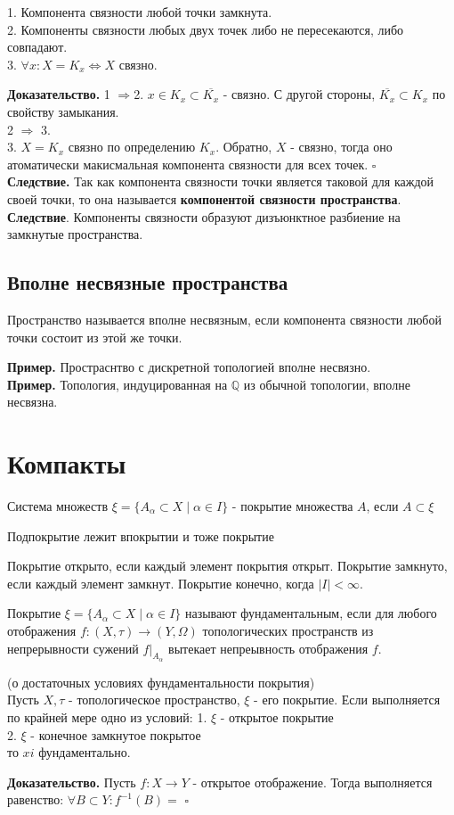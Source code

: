 \begin{theor}
1. Компонента связности любой точки замкнута.\\
2. Компоненты связности любых двух точек либо не пересекаются, либо 
совпадают.\\
3. $\forall x: X=K_x\iff X$ связно.
\end{theor}
\textbf{Доказательство.} 1 $\Rightarrow$2.
$x\in K_x\subset \overline{K_x}$ - связно.
С другой стороны, $\overline{K_x}\subset K_x$ по свойству замыкания.\\
2 $\Rightarrow$ 3. \\
3. $X=K_x$  связно по определению  $K_x$. Обратно,  $X$ - связно, тогда оно
атоматически макисмальная компонента связности для всех точек.
$\square$\\
\textbf{Следствие.} Так как компонента связности точки является таковой для
каждой своей точки, то она называется \textbf{компонентой связности 
пространства}.\\
\textbf{Следствие}. Компоненты связности образуют дизъюнктное разбиение
на замкнутые пространства. 
\subsection{Вполне несвязные пространства}
\begin{defin}
Пространство называется вполне несвязным, если компонента связности любой
точки состоит из этой же точки. 
\end{defin}
\textbf{Пример.} Простраснтво с дискретной топологией вполне несвязно.\\
\textbf{Пример.} Топология, индуцированная на $\mathbb{Q}$ из обычной 
топологии, вполне несвязна. 
\section{Компакты}
\begin{defin}
Система множеств $\xi=\{A_\alpha \subset X \mid \alpha\in I\}$ - покрытие
множества $A$, если  $A\subset \xi$
\end{defin}

Подпокрытие лежит впокрытии и тоже покрытие

Покрытие открыто, если каждый элемент покрытия открыт.
Покрытие замкнуто, если каждый элемент замкнут. 
Покрытие конечно, когда $|I|<\infty$. 
\begin{defin}
Покрытие $\xi=\{A_\alpha \subset X \mid \alpha\in I\}$ 
называют фундаментальным, если для любого отображения 
$f\colon  (X,\tau)\to (Y,\Omega)$
топологических пространств из непрерывности сужений $f|_{A_\alpha}$ 
вытекает непреывность отображения $f$.
\end{defin}
\begin{theor} (о достаточных условиях фундаментальности покрытия)\\
Пусть $X,\tau$ - топологическое пространство,  $\xi$ - его покрытие. 
Если выполняется по крайней мере одно из условий:
1. $\xi$ - открытое покрытие\\
2. $\xi$ - конечное замкнутое покрытое\\
то  $xi$ фундаментально.
\end{theor}
\textbf{Доказательство.} Пусть $f\colon X\to Y$ - открытое отображение. 
Тогда выполняется равенство: 
$\forall B\subset Y:f^{-1}(B)=$
$\square$ 
